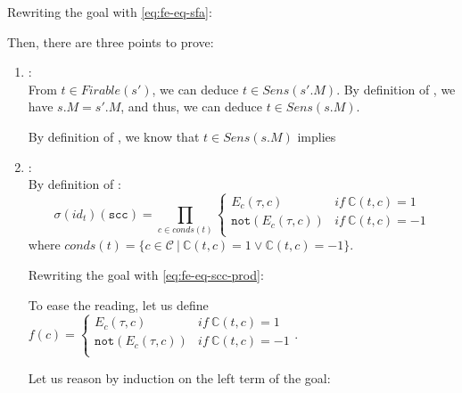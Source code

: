 \documentclass[dvipsnames,12pt]{article}
\begin{document}
\begin{niproof}
  Rewriting the goal with \eqref{eq:fe-eq-sfa}:

  Then, there are three points to prove:
  \begin{enumerate}
  \item {}:\\

    From $t\in{}Firable(s')$, we can deduce
    $t\in{}Sens(s'.M)$. By definition of \dwSitpn, we have $s.M=s'.M$,
    and thus, we can deduce $t\in{}Sens(s.M)$.

    By definition of \upSim, we know that $t\in{}Sens(s.M)$
    implies 
    
  \item {}:\\

    By definition of \upSim:
    \begin{equation}
      \sigma(id_t)(\texttt{scc})=\prod\limits_{c\in{}conds(t)}
      \begin{cases}
        E_c(\tau,c) & if~\mathbb{C}(t,c)=1 \\
        \mathtt{not}(E_c(\tau,c)) & if~\mathbb{C}(t,c)=-1 \\
      \end{cases}
      \label{eq:fe-eq-scc-prod}
    \end{equation}
    where
    $conds(t)=\{c\in\mathcal{C}~\vert~\mathbb{C}(t,c)=1\lor\mathbb{C}(t,c)=-1\}$.

    Rewriting the goal with \eqref{eq:fe-eq-scc-prod}:

    To ease the reading, let us define $f(c)=\begin{cases}
          E_c(\tau,c) & if~\mathbb{C}(t,c)=1 \\
          \mathtt{not}(E_c(\tau,c)) & if~\mathbb{C}(t,c)=-1 \\
        \end{cases}$.
    
    Let us reason by induction on the left term of the
    goal:


\end{enumerate}
\end{niproof}
\end{document}

